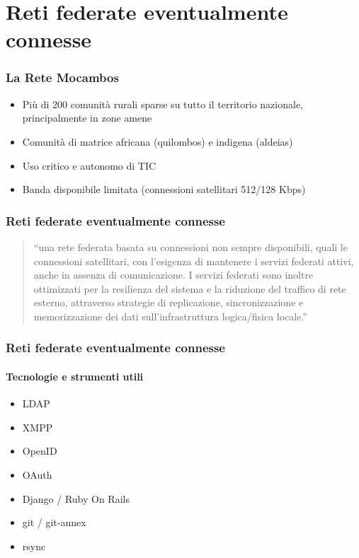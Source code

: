 \documentclass{beamer}
\begin{document}
\section{Reti federate eventualmente connesse}

\begin{frame}
  \frametitle{La Rete Mocambos}
  \begin{itemize}
    \item Più di 200 comunità rurali sparse su tutto il territorio
      nazionale, principalmente in zone amene
    \item Comunità di matrice africana (quilombos) e indigena (aldeias)
    \item Uso critico e autonomo di TIC
    \item Banda disponibile limitata (connessioni satellitari 512/128 Kbps)
    \end{itemize}
\end{frame}


\begin{frame}
  \frametitle{Reti federate eventualmente connesse}
  \begin{quotation}
    ``una rete federata basata su connessioni non sempre disponibili,
    quali le connessioni satellitari, con l'esigenza di mantenere i
    servizi federati attivi, anche in assenza di comunicazione. I
    servizi federati sono inoltre ottimizzati per la resilienza del
    sistema e la riduzione del traffico di rete esterno, attraverso
    strategie di replicazione, sincronizzazione e memorizzazione dei
    dati sull'infrastruttura logica/fisica locale.''
    \end{quotation}
\end{frame}


{
\begin{frame}
  \frametitle{Reti federate eventualmente connesse}
  \framesubtitle{Tecnologie e strumenti utili}
  \begin{itemize}
    \item LDAP
    \item XMPP
    \item OpenID
    \item OAuth
    \item Django / Ruby On Rails
    \item git / git-annex
    \item rsync
    \end{itemize}

\end{frame}
}
\end{document}
